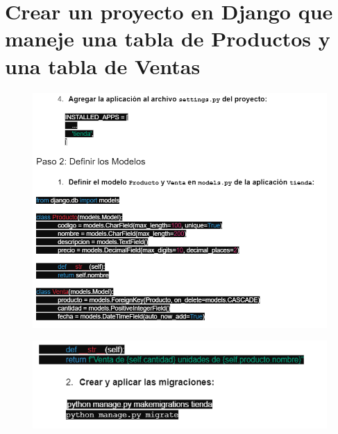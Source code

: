 \documentclass{article}
\begin{document}
\section{Crear un proyecto en Django que maneje una tabla de Productos y una tabla de Ventas}
	\begin{figure}[H]
		\centering
		\includegraphics[width=1.0\textwidth,keepaspectratio]{img/primero.png}
	\end{figure}
	\begin{figure}[H]
		\centering
		\includegraphics[width=1.0\textwidth,keepaspectratio]{img/segundo.png}
	\end{figure}
\end{document}
